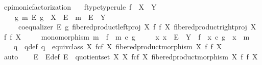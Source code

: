 \begin{isabellebody}
%
\endisadelimproof
%
\isadelimdocument
%
\endisadelimdocument
%
\isatagdocument
%
\isamarkuptrue%
%
\endisatagdocument
{\isafolddocument}%
%
\isadelimdocument
%
\endisadelimdocument
{}\isamarkupfalse%
\ epi{\isacharunderscore}{\kern0pt}monic{\isacharunderscore}{\kern0pt}factorization{\isacharcolon}{\kern0pt}\isanewline
\ \ \ f{\isacharunderscore}{\kern0pt}type{\isacharbrackleft}{\kern0pt}type{\isacharunderscore}{\kern0pt}rule{\isacharbrackright}{\kern0pt}{\isacharcolon}{\kern0pt}\ {\isachardoublequoteopen}f\ {\isacharcolon}{\kern0pt}\ X\ {\isasymrightarrow}\ Y{\isachardoublequoteclose}\isanewline
\ \ \ {\isachardoublequoteopen}{\isasymexists}\ g\ m\ E{\isachardot}{\kern0pt}\ g\ {\isacharcolon}{\kern0pt}\ X\ {\isasymrightarrow}\ E\ {\isasymand}\ m\ {\isacharcolon}{\kern0pt}\ E\ {\isasymrightarrow}\ Y\ \isanewline
\ \ \ \ {\isasymand}\ coequalizer\ E\ g\ {\isacharparenleft}{\kern0pt}fibered{\isacharunderscore}{\kern0pt}product{\isacharunderscore}{\kern0pt}left{\isacharunderscore}{\kern0pt}proj\ X\ f\ f\ X{\isacharparenright}{\kern0pt}\ {\isacharparenleft}{\kern0pt}fibered{\isacharunderscore}{\kern0pt}product{\isacharunderscore}{\kern0pt}right{\isacharunderscore}{\kern0pt}proj\ X\ f\ f\ X{\isacharparenright}{\kern0pt}\isanewline
\ \ \ \ {\isasymand}\ monomorphism\ m\ {\isasymand}\ f\ {\isacharequal}{\kern0pt}\ m\ {\isasymcirc}\isactrlsub c\ g\isanewline
\ \ \ \ {\isasymand}\ {\isacharparenleft}{\kern0pt}{\isasymforall}x{\isachardot}{\kern0pt}\ x\ {\isacharcolon}{\kern0pt}\ E\ {\isasymrightarrow}\ Y\ {\isasymlongrightarrow}\ f\ {\isacharequal}{\kern0pt}\ x\ {\isasymcirc}\isactrlsub c\ g\ {\isasymlongrightarrow}\ x\ {\isacharequal}{\kern0pt}\ m{\isacharparenright}{\kern0pt}{\isachardoublequoteclose}\isanewline
%
\isadelimproof
%
\endisadelimproof
%
\isatagproof
{}\isamarkupfalse%
\ {\isacharminus}{\kern0pt}\isanewline
\ \ \isamarkupfalse%
\ q\ \ q{\isacharunderscore}{\kern0pt}def{\isacharcolon}{\kern0pt}\ {\isachardoublequoteopen}q\ {\isacharequal}{\kern0pt}\ equiv{\isacharunderscore}{\kern0pt}class\ {\isacharparenleft}{\kern0pt}X\ \isactrlbsub f\isactrlesub {\isasymtimes}\isactrlsub c\isactrlbsub f\isactrlesub \ X{\isacharcomma}{\kern0pt}\ fibered{\isacharunderscore}{\kern0pt}product{\isacharunderscore}{\kern0pt}morphism\ X\ f\ f\ X{\isacharparenright}{\kern0pt}{\isachardoublequoteclose}\isanewline
\ \ \ \ \isamarkupfalse%
\ auto\isanewline
\ \ \isamarkupfalse%
\ E\ \ E{\isacharunderscore}{\kern0pt}def{\isacharcolon}{\kern0pt}\ {\isachardoublequoteopen}E\ {\isacharequal}{\kern0pt}\ quotient{\isacharunderscore}{\kern0pt}set\ X\ {\isacharparenleft}{\kern0pt}X\ \isactrlbsub f\isactrlesub {\isasymtimes}\isactrlsub c\isactrlbsub f\isactrlesub \ X{\isacharcomma}{\kern0pt}\ fibered{\isacharunderscore}{\kern0pt}product{\isacharunderscore}{\kern0pt}morphism\ X\ f\ f\ X{\isacharparenright}{\kern0pt}{\isachardoublequoteclose}\isanewline

\end{isabellebody}
